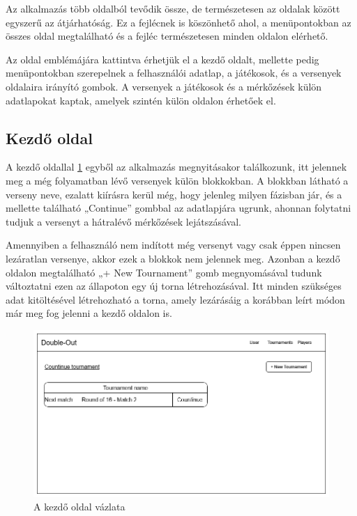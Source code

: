 Az alkalmazás több oldalból tevődik össze, de természetesen az oldalak között egyszerű az átjárhatóság. Ez a fejlécnek is köszönhető ahol, a menüpontokban az összes oldal megtalálható és a fejléc természetesen minden oldalon elérhető.

Az oldal emblémájára kattintva érhetjük el a kezdő oldalt, mellette pedig menüpontokban szerepelnek a felhasználói adatlap, a játékosok, és a versenyek oldalaira irányító gombok. A versenyek a játékosok és a mérkőzések külön adatlapokat kaptak, amelyek szintén külön oldalon érhetőek el.

\subsection{Kezdő oldal}
A kezdő oldallal \ref{fig:home} egyből az alkalmazás megnyitásakor találkozunk, itt jelennek meg a még folyamatban lévő versenyek külön blokkokban. A blokkban látható a verseny neve, ezalatt kiírásra kerül még, hogy jelenleg milyen fázisban jár, és a mellette található „Continue” gombbal az adatlapjára ugrunk, ahonnan folytatni tudjuk a versenyt a hátralévő mérkőzések lejátszásával.

Amennyiben a felhasználó nem indított még versenyt vagy csak éppen nincsen lezáratlan versenye, akkor ezek a blokkok nem jelennek meg. Azonban a kezdő oldalon megtalálható „+ New Tournament” gomb megnyomásával tudunk változtatni ezen az állapoton egy új torna létrehozásával. Itt minden szükséges adat kitöltésével létrehozható a torna, amely lezárásáig a korábban leírt módon már meg fog jelenni a kezdő oldalon is.

\begin{figure}[h]
\centering
\includegraphics[scale=0.4]{images/HomePage.png}
\caption{A kezdő oldal vázlata}
\label{fig:home}
\end{figure}

